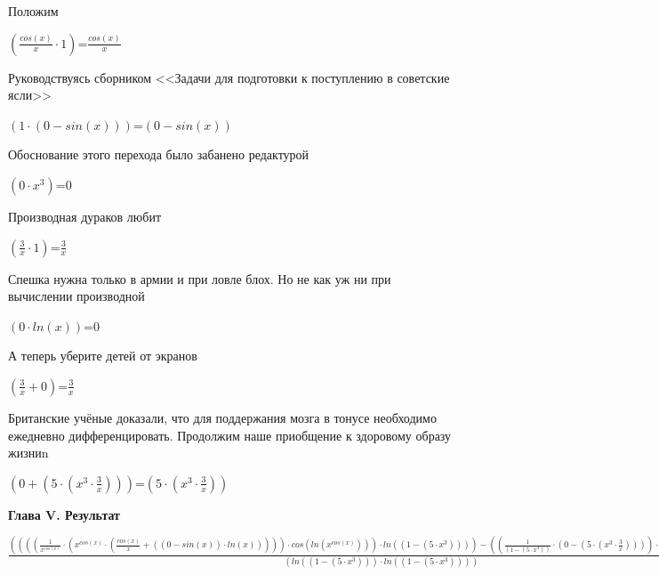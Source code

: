 \documentclass[12pt,a4paper,fleqn]{article}
\begin{document}
Положим

\begin{center}
$(\frac{cos(x)}{x} \cdot 1)$=$\frac{cos(x)}{x}$\end{center}
Руководствуясь сборником <<Задачи для подготовки к поступлению в советские ясли>>

\begin{center}
$(1 \cdot (0 - sin(x)))$=$(0 - sin(x))$\end{center}
Обоснование этого перехода было забанено редактурой

\begin{center}
$(0 \cdot x^{3})$=$0$\end{center}
Производная дураков любит

\begin{center}
$(\frac{3}{x} \cdot 1)$=$\frac{3}{x}$\end{center}
Спешка нужна только в армии и при ловле блох. Но не как уж ни при вычислении производной

\begin{center}
$(0 \cdot ln(x))$=$0$\end{center}
А теперь уберите детей от экранов

\begin{center}
$(\frac{3}{x} + 0)$=$\frac{3}{x}$\end{center}
Британские учёные доказали, что для поддержания мозга в тонусе необходимо ежедневно дифференцировать. Продолжим наше приобщение к здоровому образу жизниn

\begin{center}
$(0 + (5 \cdot (x^{3} \cdot \frac{3}{x})))$=$(5 \cdot (x^{3} \cdot \frac{3}{x}))$\end{center}
\newpage \textbf{\LARGE Глава V. Результат}

$\frac{((((\frac{1}{x^{cos(x)}} \cdot (x^{cos(x)} \cdot (\frac{cos(x)}{x} + ((0 - sin(x)) \cdot ln(x))))) \cdot cos(ln(x^{cos(x)}))) \cdot ln((1 - (5 \cdot x^{3})))) - ((\frac{1}{(1 - (5 \cdot x^{3}))} \cdot (0 - (5 \cdot (x^{3} \cdot \frac{3}{x})))) \cdot sin(ln(x^{cos(x)}))))}{(ln((1 - (5 \cdot x^{3}))) \cdot ln((1 - (5 \cdot x^{3}))))}$
\end{document}
